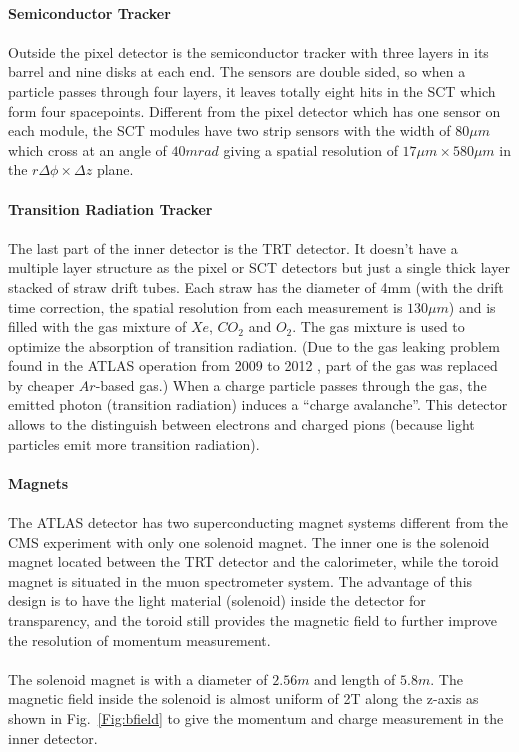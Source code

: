 \\{\bf Semiconductor Tracker}
\\
\\Outside the pixel detector is the semiconductor tracker with three layers in its barrel and nine disks at each end. The sensors are double sided, so when a particle passes through four layers, it leaves totally eight hits in the SCT which form four spacepoints. Different from the pixel detector which has one sensor on each module, the SCT modules have two strip sensors with the width of $80\mu m$ which cross at  an angle of $40mrad$ giving a spatial resolution of $17\mu m \times 580 \mu m$ in the $r\Delta \phi \times \Delta z$ plane. 
\\
\\{\bf Transition Radiation Tracker}
\\
\\The last part of the inner detector is the TRT detector. It doesn't have a multiple layer structure as the pixel or SCT detectors but just a single thick layer stacked of straw drift tubes. Each straw has the diameter of 4mm (with the drift time correction, the spatial resolution from each measurement is $130\mu m$) and is filled with the gas mixture of $Xe$, $CO_{2}$ and $O_{2}$. The gas mixture is used to optimize the absorption of transition radiation. (Due to the gas leaking problem found in the ATLAS operation from 2009 to 2012 \cite{Mindur:2139567}, part of the gas was replaced by cheaper $Ar$-based gas.) When a charge particle passes through the gas, the emitted photon (transition radiation) induces a ``charge avalanche''. This detector allows to the distinguish between electrons and charged pions (because light particles emit more transition radiation).
\\
\\{\bf Magnets}
\\
\\ The ATLAS detector has two superconducting magnet systems different from the CMS experiment with only one solenoid magnet. The inner one is the solenoid magnet located between the TRT detector and the calorimeter, while the toroid magnet is situated in the muon spectrometer system. The advantage of this design is to have the light material (solenoid) inside the detector for transparency, and the toroid still provides the magnetic field to further improve the resolution of momentum measurement\cite{magnets}.  
\\
\\The solenoid magnet is with a diameter of $2.56m$ and length of $5.8m$.  The magnetic field inside the solenoid is almost uniform of 2T along the z-axis as shown in Fig.~\ref{Fig:bfield} to give the momentum and charge measurement in the inner detector. 
